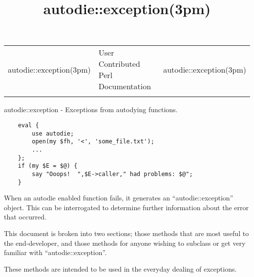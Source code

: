 \documentclass[]{article}
\title{autodie::exception(3pm)}
\author{}
\date{}
\begin{document}
\maketitle

\begin{longtable}[c]{@{}lll@{}}
\toprule\addlinespace
autodie::exception(3pm) & User Contributed Perl Documentation &
autodie::exception(3pm)
\\\addlinespace
\bottomrule
\end{longtable}


autodie::exception - Exceptions from autodying functions.


\begin{verbatim}
    eval {
        use autodie;
        open(my $fh, '<', 'some_file.txt');
        ...
    };
    if (my $E = $@) {
        say "Ooops!  ",$E->caller," had problems: $@";
    }
\end{verbatim}


When an autodie enabled function fails, it generates an
``autodie::exception'' object. This can be interrogated to determine
further information about the error that occurred.

This document is broken into two sections; those methods that are most
useful to the end-developer, and those methods for anyone wishing to
subclass or get very familiar with ``autodie::exception''.


These methods are intended to be used in the everyday dealing of
exceptions.
\end{document}
